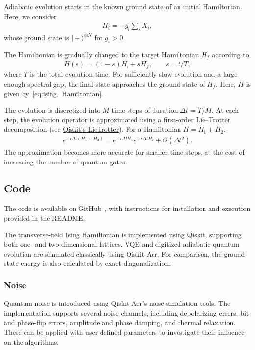 \documentclass[aps,prl,reprint,amsmath,amssymb,twocolumn,preprintnumbers,superscriptaddress,10pt]{revtex4-2}
\renewcommand{\ket}[1]{\big| #1 \big\rangle}
\begin{document}
Adiabatic evolution starts in the known ground state of an initial
Hamiltonian.
Here, we consider
\begin{align}
    H_i = -g_i\sum_i X_i,
\end{align}
whose ground state is $\ket{+}^{\otimes N}$ for $g_i>0$.

The Hamiltonian is gradually changed to the target Hamiltonian $H_f$ according to
\begin{align}
    H(s) = (1-s)H_i + sH_f,
    \qquad s = t/T,
\end{align}
where $T$ is the total evolution time. For sufficiently slow evolution and a large enough spectral gap, the final state approaches the ground state of $H_f$.
Here, $H$ is given by~\eqref{eq:ising_Hamiltonian}.

The evolution is discretized into $M$ time steps of duration $\Delta t=T/M$. At each step, the evolution operator is approximated using a first-order Lie--Trotter decomposition (see \href{https://quantum.cloud.ibm.com/docs/en/api/qiskit/qiskit.synthesis.LieTrotter}{Qiskit's LieTrotter}).
For a Hamiltonian $H=H_1+H_2$,
\begin{align}
    e^{-i\Delta t(H_1+H_2)}
    =e^{-i\Delta t H_1}e^{-i\Delta t H_2}
    +\mathcal{O}(\Delta t^2).
\end{align}
The approximation becomes more accurate for smaller time steps, at the cost of increasing the number of quantum gates.

\subsection{Code}

The code is available on GitHub~\cite{code}, with instructions for installation and execution provided in the README.

The transverse-field Ising Hamiltonian is implemented using Qiskit, supporting both one- and two-dimensional lattices. 
VQE and digitized adiabatic quantum evolution are simulated classically using Qiskit Aer. 
For comparison, the ground-state energy is also calculated by exact diagonalization.

\subsubsection{Noise}

Quantum noise is introduced using Qiskit Aer's noise simulation tools. 
The implementation supports several noise channels, including depolarizing errors, bit- and phase-flip errors, amplitude and phase damping, and thermal relaxation.
These can be applied with user-defined parameters to investigate their influence on the algorithms.
\end{document}
